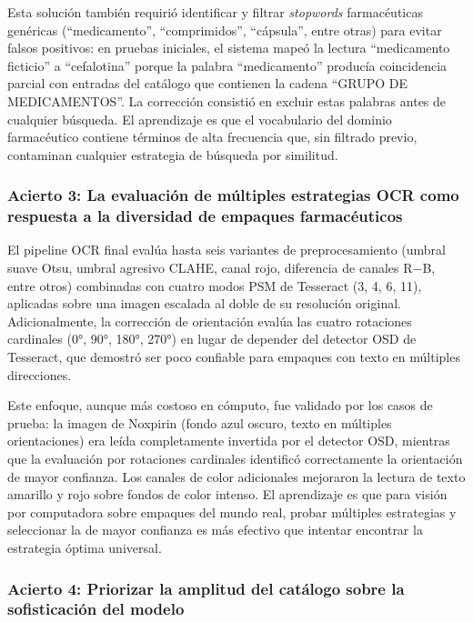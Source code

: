 Esta solución también requirió identificar y filtrar \textit{stopwords} farmacéuticas genéricas (``medicamento'', ``comprimidos'', ``cápsula'', entre otras) para evitar falsos positivos: en pruebas iniciales, el sistema mapeó la lectura ``medicamento ficticio'' a ``cefalotina'' porque la palabra ``medicamento'' producía coincidencia parcial con entradas del catálogo que contienen la cadena ``GRUPO DE MEDICAMENTOS''. La corrección consistió en excluir estas palabras antes de cualquier búsqueda. El aprendizaje es que el vocabulario del dominio farmacéutico contiene términos de alta frecuencia que, sin filtrado previo, contaminan cualquier estrategia de búsqueda por similitud.

\subsubsection*{Acierto 3: La evaluación de múltiples estrategias OCR como respuesta a la diversidad de empaques farmacéuticos}

El pipeline OCR final evalúa hasta seis variantes de preprocesamiento (umbral suave Otsu, umbral agresivo CLAHE, canal rojo, diferencia de canales R$-$B, entre otros) combinadas con cuatro modos PSM de Tesseract (3, 4, 6, 11), aplicadas sobre una imagen escalada al doble de su resolución original. Adicionalmente, la corrección de orientación evalúa las cuatro rotaciones cardinales (0°, 90°, 180°, 270°) en lugar de depender del detector OSD de Tesseract, que demostró ser poco confiable para empaques con texto en múltiples direcciones.

Este enfoque, aunque más costoso en cómputo, fue validado por los casos de prueba: la imagen de Noxpirin (fondo azul oscuro, texto en múltiples orientaciones) era leída completamente invertida por el detector OSD, mientras que la evaluación por rotaciones cardinales identificó correctamente la orientación de mayor confianza. Los canales de color adicionales mejoraron la lectura de texto amarillo y rojo sobre fondos de color intenso. El aprendizaje es que para visión por computadora sobre empaques del mundo real, probar múltiples estrategias y seleccionar la de mayor confianza es más efectivo que intentar encontrar la estrategia óptima universal.

\subsubsection*{Acierto 4: Priorizar la amplitud del catálogo sobre la sofisticación del modelo}

